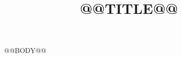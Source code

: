 \documentclass[12pt,a4paper]{ctexart}
\title{\sffamily\bfseries\fontsize{22}{28}\selectfont @@TITLE@@}
\author{}
\date{}
\begin{document}
\maketitle
@@BODY@@
\end{document}

